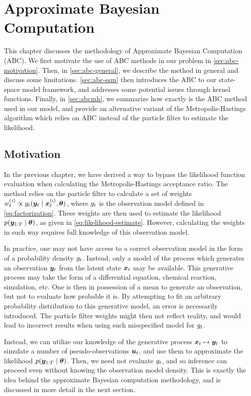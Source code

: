 \chapter{Approximate Bayesian Computation}
\label{chap:abc}

This chapter discusses the methodology of Approximate Bayesian Computation (ABC). We first motivate the use of ABC methods in our problem in \autoref{sec:abc-motivation}. Then, in \autoref{sec:abc-general}, we describe the method in general and discuss some limitations. \autoref{sec:abc-ssm} then introduces the ABC to our state-space model framework, and addresses some potential issues through kernel functions. Finally, in \autoref{sec:abcmh}, we summarize how exactly is the ABC method used in our model, and provide an alternative variant of the Metropolis-Hastings algorithm which relies on ABC instead of the particle filter to estimate the likelihood.


\section{Motivation} \label{sec:abc-motivation}
In the previous chapter, we have derived a way to bypass the likelihood function evaluation when calculating the Metropolis-Hastings acceptance ratio. The method relies on the particle filter to calculate a set of weights $w_t^{(i)} \propto g_t(\bm{y}_t \mid \bm{x}_t^{(i)}, \bm{\theta})$, where $g_t$ is the observation model defined in \eqref{eq:factorization}. These weights are then used to estimate the likelihood $p(\bm{y}_{1:T} \mid \bm{\theta})$, as given in \eqref{eq:likelihood-estimate}. However, calculating the weights in such way requires full knowledge of this observation model.

In practice, one may not have access to a correct observation model in the form of a probability density $g_t$. Instead, only a model of the process which generates an observation $\bm{y}_t$ from the latent state $\bm{x}_t$ may be available. This generative process may take the form of a differential equation, chemical reaction, simulation, etc. One is then in possession of a mean to generate an observation, but not to evaluate how probable it is. By attempting to fit an arbitrary probability distribution to this generative model, an error is necessarily introduced. The particle filter weights might then not reflect reality, and would lead to incorrect results when using such misspecified model for $g_t$.

Instead, we can utilize our knowledge of the generative process $\bm{x}_t \mapsto \bm{y}_t$ to simulate a number of pseudo-observations $\bm{u}_t$, and use them to approximate the likelihood ${p(\bm{y}_{1:T} \mid \bm{\theta})}$. Then, we need not evaluate $g_t$, and so inference can proceed even without knowing the observation model density. This is exactly the idea behind the approximate Bayesian computation methodology, and is discussed in more detail in the next section.

